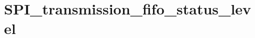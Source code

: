 \hypertarget{group___s_p_i__transmission__fifo__status__level}{\section{S\-P\-I\-\_\-transmission\-\_\-fifo\-\_\-status\-\_\-level}
\label{group___s_p_i__transmission__fifo__status__level}
}
